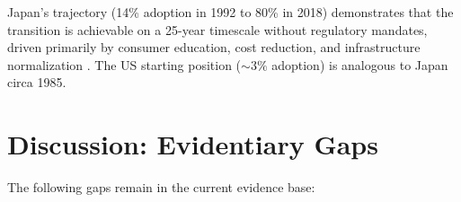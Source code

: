 \documentclass[10pt,letterpaper]{article}
\begin{document}
Japan's trajectory (14\% adoption in 1992 to 80\% in 2018) demonstrates
that the transition is achievable on a 25-year timescale without regulatory
mandates, driven primarily by consumer education, cost reduction, and
infrastructure normalization \citep{JapaneseCabinet2018}. The US starting
position ($\sim3\%$ adoption) is analogous to Japan circa 1985.

\section{Discussion: Evidentiary Gaps}
\label{sec:discussion}

The following gaps remain in the current evidence base:
\end{document}
